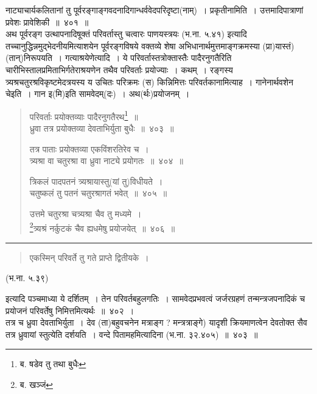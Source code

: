 \documentclass[11pt, openany]{book}
\begin{document}
{\qtt नाट्याचार्य}कलितानां तु पूर्वरङ्गाङ्गवदनादिगान्धर्ववेदपरिदृष्टा(नाम्)~। {\qtt प्रकृतीनामिति~।} उत्तमादिपात्राणां प्रवेशः प्रावेशिकी~॥~४०१~॥\\

अथ पूर्वरङ्ग उत्थापनादिषूक्तं {\qtt परिवर्तास्तु चत्वारः पाणयस्त्रयः} (भ.ना. ५.४१) इत्यादि तच्चानुद्धिन्नमुद्भेदनीयमित्याशयेन पूर्वरङ्गविषये वक्तव्ये शेषा अभिधानार्थमुत्तमाङ्गक्रमस्या (प्रा)यास्तं) (तान्)निरूपयति~। गत्याश्रयेणेत्यादि~। ये परिवर्तास्तत्रोक्तास्तैः पादैरनुगतैरिति चारीभिस्तालप्रमिताभिर्गतेराश्रयणेन तथैव परिवर्ताः प्रयोज्याः~। कथम्~। रङ्गस्य त्र्यश्रचतुरश्रविकृष्टमेदत्रयस्य य उचितः परिक्रमः (स) किन्निमित्तः परिवर्तकानामित्याह~। गानेनार्थवशेन चेइति~। गान इ(मि)इति सामवेदम्(दः)~। अथ(र्थः)प्रयोजनम्~।

\newpage

\begin{quote}
{\na परिवर्ताः प्रयोक्तव्याः पादैरनुगतैरथ\renewcommand{\thefootnote}{1}\footnote{ब. षडेव तु तथा बुधैः}~॥\\
 ध्रुवा तत्र प्रयोक्तव्या देवताभिर्युता बुधैः~॥~४०३~॥

 तत्र पाताः प्रयोक्तव्या एकविंशरतिरेव च~।\\
 त्र्यश्रा वा चतुरश्रा वा ध्रुवा नाट्ये प्रयोगतः~॥~४०४~॥

 त्रिकलं पादपतनं त्र्यश्रायास्तु(यां तु)विधीयते~।\\
 चतुष्कलं तु पतनं चतुरश्रागतं भवेत्~॥~४०५~॥

 उत्तमे चतुरश्रा चत्र्यश्रा चैव तु मध्यमे~।\\
 \renewcommand{\thefootnote}{2}\footnote{ब. खञ्जं}त्र्यश्रं नर्कुटकं चैव ह्यधमेषु प्रयोजयेत्~॥~४०६~॥}
\end{quote}

\hrule

\begin{quote}
{\qt एकस्मिन् परिवर्ते तु गते प्राप्ते द्वितीयके~। }
\end{quote}

\begin{center}
(भ.ना. ५.३९) 
\end{center}

\noindent
इत्यादि {\qtt पञ्चमाध्या} ये दर्शितम्~। तेन परिवर्तबहुलगतिः~। सामवेदप्रभवत्वं जर्जरग्रहणं तन्मन्त्रजपनादिकं च प्रयोजनं परिवर्तेषु निमित्तमित्यर्थः~॥~४०२~।\\

तत्र च {\qtt ध्रुवा देवताभिर्युता}~। देव (ता)बहुवचनेन मत्राङ्ग ? मन्त्रत्राङ्गे) यादृशी क्रियमाणत्वेन देवतोक्त सैव तत्र ध्रुवायां स्तुत्येति दर्शयति~। वन्दे पितामहमित्यादिना (भ.ना. ३२.४०५)~॥~४०३~॥\\
\end{document}
